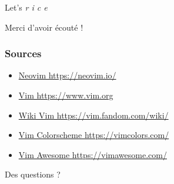 \documentclass[10pt]{beamer}
\begin{document}
	\begin{frame}{Let's \textit{r i c e}}
	\end{frame}

\begin{appendix}

	\begin{frame}[standout]
		Merci d'avoir écouté !
	\end{frame}

	\begin{frame}
		\frametitle{Sources}
		\begin{itemize}
			\item \href{https://neovim.io/}{Neovim https://neovim.io/}
			\item \href{https://www.vim.org}{Vim https://www.vim.org}
			\item \href{https://vim.fandom.com/wiki/}{Wiki Vim https://vim.fandom.com/wiki/}
			\item \href{https://vimcolors.com/}{Vim Colorscheme https://vimcolors.com/}
			\item \href{https://vimawesome.com/}{Vim Awesome https://vimawesome.com/}
		\end{itemize}
	\end{frame}

	\begin{frame}[standout]
		Des questions ?
	\end{frame}

\end{appendix}
\end{document}
